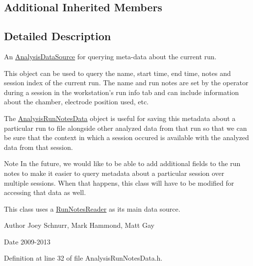 \subsection*{Additional Inherited Members}


\subsection{Detailed Description}
An \hyperlink{class_picto_1_1_analysis_data_source}{Analysis\-Data\-Source} for querying meta-\/data about the current run. 

This object can be used to query the name, start time, end time, notes and session index of the current run. The name and run notes are set by the operator during a session in the workstation's run info tab and can include information about the chamber, electrode position used, etc.

The \hyperlink{class_picto_1_1_analysis_run_notes_data}{Analysis\-Run\-Notes\-Data} object is useful for saving this metadata about a particular run to file alongside other analyzed data from that run so that we can be sure that the context in which a session occured is available with the analyzed data from that session.

\begin{DoxyNote}{Note}
In the future, we would like to be able to add additional fields to the run notes to make it easier to query metadata about a particular session over multiple sessions. When that happens, this class will have to be modified for accessing that data as well.

This class uses a \hyperlink{class_picto_1_1_run_notes_reader}{Run\-Notes\-Reader} as its main data source. 
\end{DoxyNote}
\begin{DoxyAuthor}{Author}
Joey Schnurr, Mark Hammond, Matt Gay 
\end{DoxyAuthor}
\begin{DoxyDate}{Date}
2009-\/2013 
\end{DoxyDate}


Definition at line 32 of file Analysis\-Run\-Notes\-Data.\-h.



